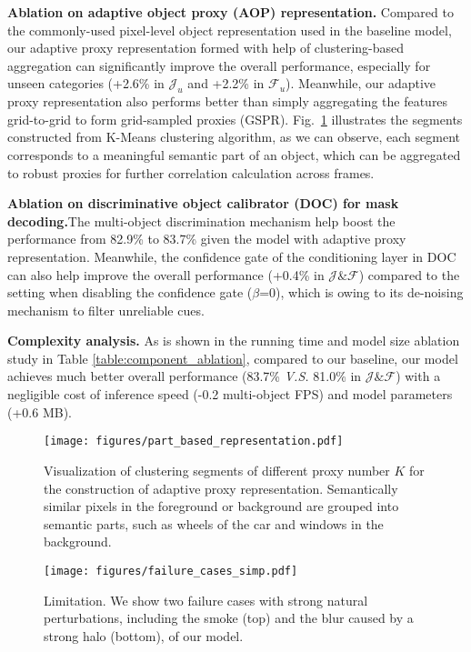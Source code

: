 \documentclass[sigconf]{acmart}
\begin{document}
\noindent\textbf{Ablation on adaptive object proxy (AOP) representation.}
Compared to the commonly-used pixel-level object representation used in the baseline model, our adaptive proxy representation formed with help of clustering-based aggregation can significantly improve the overall performance, especially for unseen categories (+2.6\% in $\mathcal{J}_u$ and +2.2\% in $\mathcal{F}_u$). Meanwhile, our adaptive proxy representation also performs better than simply aggregating the features grid-to-grid to form grid-sampled proxies (GSPR). Fig.~\ref{fig:clustering_examples} illustrates the segments constructed from K-Means clustering algorithm, as we can observe, each segment corresponds to a meaningful semantic part of an object, which can be aggregated to robust proxies for further correlation calculation across frames.

\noindent\textbf{Ablation on discriminative object calibrator (DOC) for mask decoding.}The multi-object discrimination mechanism help boost the performance from 82.9\% to 83.7\% given the model with adaptive proxy representation. Meanwhile, the confidence gate of the conditioning layer in DOC can also help improve the overall performance (+0.4\% in $\mathcal{J}\&\mathcal{F}$) compared to the setting when disabling the confidence gate ($\beta$=0), which is owing to its de-noising mechanism to filter unreliable cues.

\noindent\textbf{Complexity analysis.} As is shown in the running time and model size ablation study in Table \ref{table:component_ablation}, compared to our baseline, our model achieves much better overall performance (83.7\% \textit{V.S.} 81.0\% in $\mathcal{J}\&\mathcal{F}$) with a negligible cost of inference speed (-0.2 multi-object FPS) and model parameters (+0.6 MB).

\begin{figure}[t]
	\centering
	\texttt{[image: figures/part\_based\_representation.pdf]}
\caption{Visualization of clustering segments of different proxy number $K$ for the construction of adaptive proxy representation. Semantically similar pixels in the foreground or background are grouped into semantic parts, such as wheels of the car and windows in the background.}
	\label{fig:clustering_examples}
\end{figure} \begin{figure}[t!]
	\centering
	\texttt{[image: figures/failure\_cases\_simp.pdf]}
\caption{Limitation. We show two failure cases with strong natural perturbations, including the smoke (top) and the blur caused by a strong halo (bottom), of our model.}
	\label{fig:failure_case}
\end{figure} 
\end{document}
